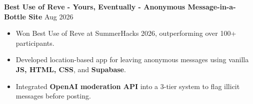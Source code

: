 \documentclass[10pt,letterpaper]{article}
\begin{document}
\vspace*{0.5em}
\textbf{Best Use of Reve - Yours, Eventually - Anonymous Message-in-a-Bottle Site} \hfill Aug 2026 \\
\begin{itemize}
    \item Won Best Use of Reve at SummerHacks 2026, outperforming over 100+ participants.
    \item Developed location-based app for leaving anonymous messages using vanilla \textbf{JS, HTML, CSS}, and \textbf{Supabase}.
    \item Integrated \textbf{OpenAI moderation API} into a 3-tier system to flag illicit messages before posting.
\end{itemize}



\end{document}
